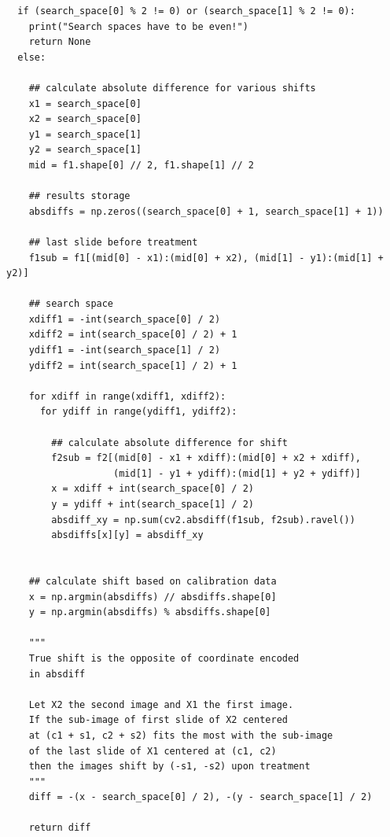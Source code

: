 \documentclass[pdftex,12pt,a4paper]{report}
\begin{document}
\begin{appendices}
\begin{verbatim}
  if (search_space[0] % 2 != 0) or (search_space[1] % 2 != 0):
    print("Search spaces have to be even!")
    return None
  else:
    
    ## calculate absolute difference for various shifts
    x1 = search_space[0]
    x2 = search_space[0]
    y1 = search_space[1]
    y2 = search_space[1]
    mid = f1.shape[0] // 2, f1.shape[1] // 2
        
    ## results storage        
    absdiffs = np.zeros((search_space[0] + 1, search_space[1] + 1))

    ## last slide before treatment
    f1sub = f1[(mid[0] - x1):(mid[0] + x2), (mid[1] - y1):(mid[1] + y2)]
    
    ## search space 
    xdiff1 = -int(search_space[0] / 2)
    xdiff2 = int(search_space[0] / 2) + 1
    ydiff1 = -int(search_space[1] / 2)
    ydiff2 = int(search_space[1] / 2) + 1
    
    for xdiff in range(xdiff1, xdiff2):
      for ydiff in range(ydiff1, ydiff2):
      
        ## calculate absolute difference for shift
        f2sub = f2[(mid[0] - x1 + xdiff):(mid[0] + x2 + xdiff), 
                   (mid[1] - y1 + ydiff):(mid[1] + y2 + ydiff)]
        x = xdiff + int(search_space[0] / 2)
        y = ydiff + int(search_space[1] / 2)
        absdiff_xy = np.sum(cv2.absdiff(f1sub, f2sub).ravel())
        absdiffs[x][y] = absdiff_xy
        
        
    ## calculate shift based on calibration data
    x = np.argmin(absdiffs) // absdiffs.shape[0]
    y = np.argmin(absdiffs) % absdiffs.shape[0]
    
    """
    True shift is the opposite of coordinate encoded
    in absdiff
    
    Let X2 the second image and X1 the first image.
    If the sub-image of first slide of X2 centered
    at (c1 + s1, c2 + s2) fits the most with the sub-image
    of the last slide of X1 centered at (c1, c2)
    then the images shift by (-s1, -s2) upon treatment
    """
    diff = -(x - search_space[0] / 2), -(y - search_space[1] / 2)

    return diff
\end{verbatim}

\end{appendices}
\end{document}
